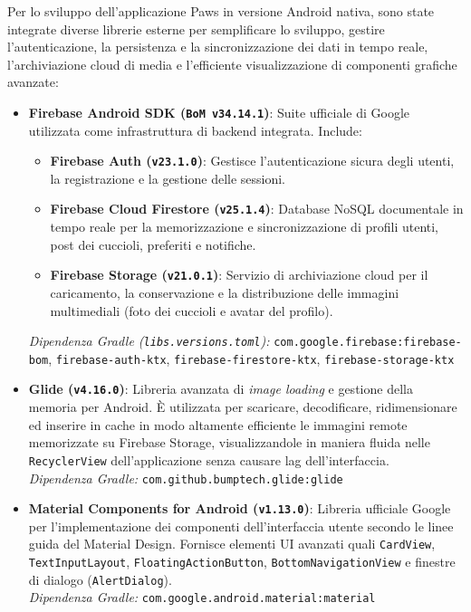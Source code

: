 \documentclass[a4paper]{report}
\begin{document}
Per lo sviluppo dell'applicazione Paws in versione Android nativa, sono state integrate diverse librerie esterne per semplificare lo sviluppo, gestire l'autenticazione, la persistenza e la sincronizzazione dei dati in tempo reale, l'archiviazione cloud di media e l'efficiente visualizzazione di componenti grafiche avanzate:
\begin{itemize}
    \item \textbf{Firebase Android SDK (\texttt{BoM v34.14.1})}: Suite ufficiale di Google utilizzata come infrastruttura di backend integrata. Include:
    \begin{itemize}
        \item \textbf{Firebase Auth (\texttt{v23.1.0})}: Gestisce l'autenticazione sicura degli utenti, la registrazione e la gestione delle sessioni.
        \item \textbf{Firebase Cloud Firestore (\texttt{v25.1.4})}: Database NoSQL documentale in tempo reale per la memorizzazione e sincronizzazione di profili utenti, post dei cuccioli, preferiti e notifiche.
        \item \textbf{Firebase Storage (\texttt{v21.0.1})}: Servizio di archiviazione cloud per il caricamento, la conservazione e la distribuzione delle immagini multimediali (foto dei cuccioli e avatar del profilo).
    \end{itemize}
    \vspace{0.1cm}
    \textit{Dipendenza Gradle (\texttt{libs.versions.toml}):} \texttt{com.google.firebase:\allowbreak firebase-bom}, \texttt{firebase-auth-\allowbreak ktx}, \texttt{firebase-firestore-ktx}, \texttt{firebase-storage-ktx}

    \vspace{0.3cm}
    \item \textbf{Glide (\texttt{v4.16.0})}: Libreria avanzata di \textit{image loading} e gestione della memoria per Android. È utilizzata per scaricare, decodificare, ridimensionare ed inserire in cache in modo altamente efficiente le immagini remote memorizzate su Firebase Storage, visualizzandole in maniera fluida nelle \texttt{RecyclerView} dell'applicazione senza causare lag dell'interfaccia. \\
    \textit{Dipendenza Gradle:} \texttt{com.github.bumptech.glide:\allowbreak glide}

    \vspace{0.3cm}
    \item \textbf{Material Components for Android (\texttt{v1.13.0})}: Libreria ufficiale Google per l'implementazione dei componenti dell'interfaccia utente secondo le linee guida del Material Design. Fornisce elementi UI avanzati quali \texttt{CardView}, \texttt{TextInput\allowbreak Layout}, \texttt{FloatingAction\allowbreak Button}, \texttt{BottomNavigation\allowbreak View} e finestre di dialogo (\texttt{AlertDialog}). \\
    \textit{Dipendenza Gradle:} \texttt{com.google.android.material:\allowbreak material}


\end{itemize}
\end{document}
